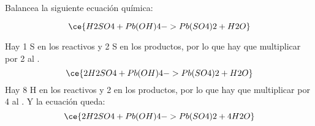 Balancea la siguiente ecuación química:

\[
    \ce{H2SO4 + Pb(OH)4 -> Pb(SO4)2 + H2O}
\]

\begin{solutionbox}{4cm}
    Hay 1 S en los reactivos y 2 S en los productos, por lo que hay que multiplicar por 2 al .
    \[
        \ce{2H2SO4 + Pb(OH)4 -> Pb(SO4)2 + H2O}
    \]
    Hay 8 H en los reactivos y 2 en los productos, por lo que hay que multiplicar por 4 al . Y la ecuación queda:
    \[
        \ce{2H2SO4 + Pb(OH)4 -> Pb(SO4)2 + 4H2O}
    \]
\end{solutionbox}